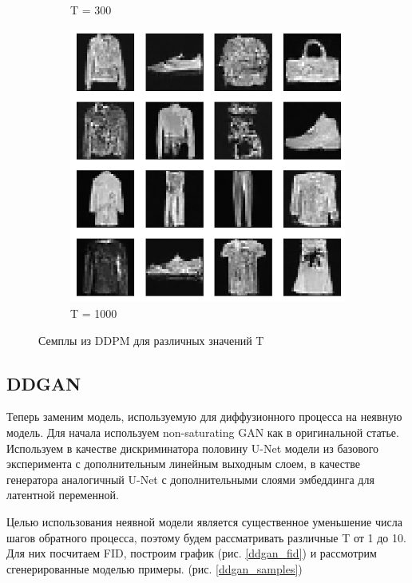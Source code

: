 \documentclass{article}
\begin{document}
\begin{figure}[H]
\begin{subfigure}[h]{0.3\linewidth}
		\caption{T = 300}
	\end{subfigure}
	\hfill
	\begin{subfigure}[h]{0.3\linewidth}
		\centering
		\includegraphics[scale=0.3]{../code/generated_DDPM_1000.png}
		\caption{T = 1000}
	\end{subfigure}
\caption{Семплы из DDPM для различных значений T}\label{ddpm_samples}
\end{figure}

\subsection{DDGAN}
Теперь заменим модель, используемую для диффузионного процесса на неявную модель. Для начала используем non-saturating GAN \cite{https://doi.org/10.48550/arxiv.1406.2661} как в оригинальной статье. Используем в качестве дискриминатора половину U-Net модели из базового эксперимента с дополнительным линейным выходным слоем, в качестве генератора аналогичный U-Net с дополнительными слоями эмбеддинга для латентной переменной. 

Целью использования неявной модели является существенное уменьшение числа шагов обратного процесса, поэтому будем рассматривать различные T от 1 до 10. Для них посчитаем FID, построим график (рис. \ref{ddgan_fid}) и рассмотрим сгенерированные моделью примеры. (рис. \ref{ddgan_samples})
\end{document}
